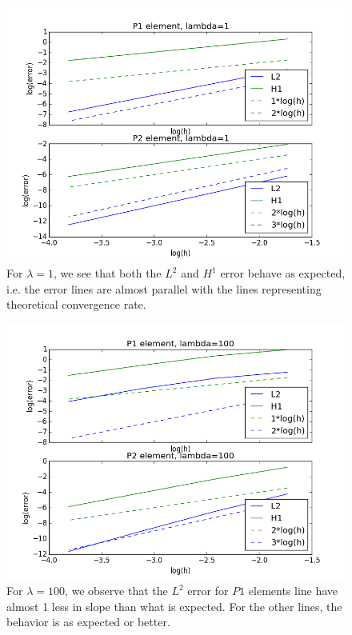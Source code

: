 \documentclass[11pt,a4paper]{report}
\begin{document}
\begin{figure}
  \includegraphics[width=\linewidth]{l1.png}
  \caption{For $\lambda =1$, we see that both the $L^2$ and $H^1$ error behave as expected, i.e. the error lines are almost parallel with the lines representing theoretical convergence rate.}
  \label{Fig 3}
\end{figure}


\begin{figure}
  \includegraphics[width=\linewidth]{l100.png}
  \caption{For $\lambda =100$, we observe that the $L^2$ error for $P1$ elements line have almost 1 less in slope than what is expected. For the other lines, the behavior is as expected or better. }
  \label{Fig 4}
\end{figure}
\end{document}
